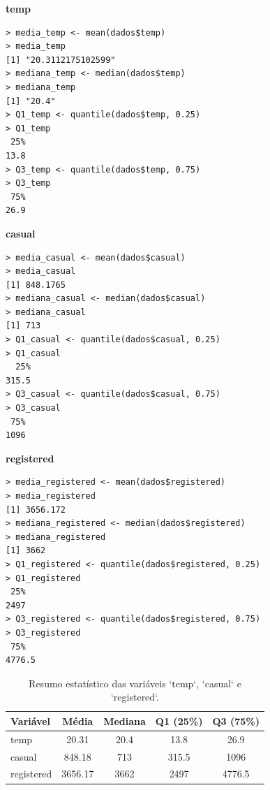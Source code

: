 \documentclass[a4paper,11pt]{article}
\begin{document}
\begin{description}[leftmargin=*]
\item \textbf{temp}
\begin{lstlisting}
> media_temp <- mean(dados$temp)
> media_temp 
[1] "20.3112175102599"
> mediana_temp <- median(dados$temp)
> mediana_temp
[1] "20.4"
> Q1_temp <- quantile(dados$temp, 0.25)
> Q1_temp      
 25% 
13.8
> Q3_temp <- quantile(dados$temp, 0.75)
> Q3_temp      
 75% 
26.9
\end{lstlisting}

\vspace{5mm}

\item \textbf{casual}
\begin{lstlisting}
> media_casual <- mean(dados$casual)
> media_casual
[1] 848.1765
> mediana_casual <- median(dados$casual)
> mediana_casual
[1] 713
> Q1_casual <- quantile(dados$casual, 0.25)
> Q1_casual
  25% 
315.5
> Q3_casual <- quantile(dados$casual, 0.75)
> Q3_casual
 75% 
1096
\end{lstlisting}

\vspace{5mm}

\item \textbf{registered}
\begin{lstlisting}
> media_registered <- mean(dados$registered)
> media_registered  
[1] 3656.172
> mediana_registered <- median(dados$registered)
> mediana_registered 
[1] 3662
> Q1_registered <- quantile(dados$registered, 0.25)
> Q1_registered
 25% 
2497
> Q3_registered <- quantile(dados$registered, 0.75)
> Q3_registered
 75% 
4776.5
\end{lstlisting}

\begin{table}[H]
    \centering
    \label{tab:resumo_estatistico}
    \begin{tabular}{l c c c c}
        \toprule
        \textbf{Variável} & \textbf{Média} & \textbf{Mediana} & \textbf{Q1 (25\%)} & \textbf{Q3 (75\%)} \\
        \midrule
        temp        & 20.31 & 20.4  & 13.8   & 26.9    \\
        casual      & 848.18 & 713   & 315.5  & 1096    \\
        registered  & 3656.17 & 3662 & 2497  & 4776.5  \\
        \bottomrule
    \end{tabular}
    \caption{Resumo estatístico das variáveis `temp`, `casual` e `registered`.}
\end{table}




\end{description}
\end{document}
